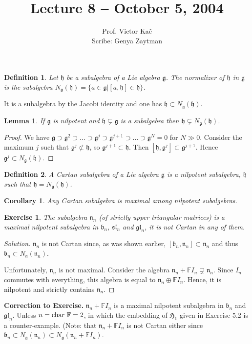 \documentclass[12pt, fullpage]{article}
\title{Lecture 8 -- October 5, 2004}
\author{Prof. Victor Ka\v{c}\\ Scribe: Genya Zaytman}
\date{}
\newtheorem{corollary}{Corollary}
\newtheorem{lemma}{Lemma}
\newtheorem{definition}{Definition}
\newtheorem{exercise}{Exercise}[section]
\renewcommand{\b}{\mathfrak{b}}
\newcommand{\g}{\mathfrak{g}}
\newcommand{\h}{\mathfrak{h}}
\newcommand{\n}{\mathfrak{n}}
\newcommand{\gl}{\mathfrak{gl}}
\newcommand{\sL}{\mathfrak{sl}}
\renewcommand{\char}{{\rm char\ }}
\newcommand{\F}{\mathbb{F}}
\renewcommand{\H}{\mathfrak{H}}
\newcommand{\Ngh}{N_\g(\h)}
\begin{document}
\maketitle

\setcounter{section}{8}

\begin{definition}
Let $\h$ be a subalgebra of a Lie algebra $\g$.  The \emph{normalizer} of
$\h$ in $\g$ is the subalgebra $N_\g(\h)=\{a\in\g|[a,\h]\in\h\}$. 
\end{definition}

It is a subalgebra by the Jacobi identity and one has $\h\subset
N_\g(\h)$.

\begin{lemma}
If $\g$ is nilpotent and $\h\subsetneq\g$ is a subalgebra then
$\h\subsetneq N_\g(\h)$.
\end{lemma}
\begin{proof}
We have $\g\supset\g^2\supset\ldots
\supset\g^j\supset\g^{j+1}\supset\ldots \supset\g^N=0$ for $N\gg 0$.
Consider the maximum $j$ such that $\g^j\not\subset\h$, so
$\g^{j+1}\subset\h$.  Then $[\h,\g^j]\subset\g^{j+1}$.  Hence
$\g^j\subset\Ngh$.
\end{proof}

\begin{definition}
A \emph{Cartan subalgebra} of a Lie algebra $\g$ is a nilpotent
subalgebra, $\h$ such that $\h=\Ngh$.
\end{definition}

\begin{corollary}
Any Cartan subalgebra is maximal among nilpotent subalgebras.
\end{corollary}

\begin{exercise}
The subalgebra $\n_n$ (of strictly upper triangular matrices) is a
maximal nilpotent subalgebra in $\b_n$, $\sL_n$ and $\gl_n$, it is not
Cartan in any of them.
\end{exercise}
\begin{proof}[Solution]
$\n_n$ is not Cartan since, as was shown earlier,
$[\b_n,\n_n]\subset\n_n$ and thus $\b_n\subset N_\g(\n_n)$.

Unfortunately, $\n_n$ is not maximal.  Consider the algebra $\n_n+\F
I_n\supsetneq\n_n$.  Since $I_n$ commutes with everything, this
algebra is equal to $\n_n\oplus\F I_n$.  Hence, it is nilpotent and
strictly contains $\n_n$.
\end{proof}

{\bf Correction to Exercise.} $\n_n+\F I_n$ is a maximal nilpotent
subalgebra in $\b_n$ and $\gl_n$.  Unless $n=\char \F=2$, in which the
embedding of $\H_1$ given in Exercise 5.2 is a counter-example.  (Note:
that $\n_n+\F I_n$ is not Cartan either since $\b_n\subset
N_\g(\n_n)\subset N_\g(\n_n+\F I_n)$.
\end{document}

